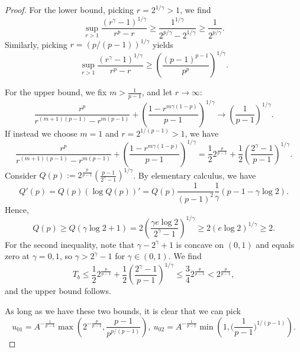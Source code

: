 \documentclass[12pt]{amsart}%
\theoremstyle{definition}
\theoremstyle{remark}
\renewcommand{\ge}{\geqslant}
\renewcommand{\le}{\leqslant}
\begin{document}
\begin{proof}
For the lower bound, picking $r=2^{1/\gamma}>1$, we find 
\[
 \sup_{r>1}\frac{(r^{\gamma}-1)^{1/\gamma}}{r^p-r}\ge \frac{1^{1/\gamma}}{2^{p/\gamma}-2^{1/\gamma}}\ge \frac{1}{2^{p/\gamma}}.
\]
Similarly, picking $r=(p/(p-1))^{1/\gamma}$ yields\[
\sup_{r>1}\frac{(r^{\gamma}-1)^{1/\gamma}}{r^p-r}\ge \left(\frac{(p-1)^{p-1}}{p^p}\right)^{1/\gamma}.
\]

For the upper bound, we fix $m>\frac{1}{p-1}$, and let $r\to\infty$:
\[
\frac{r^p}{r^{(m+1)(p-1)}-r^{m(p-1)}}+\left(\frac{1-r^{m\gamma(1-p)}}{p-1}\right)^{1/\gamma}\to \left(\frac{1}{p-1}\right)^{1/\gamma}.
\] 
If instead we choose $m=1$ and $r=2^{1/(p-1)}>1$, we have 
\[
\frac{r^p}{r^{(m+1)(p-1)}-r^{m(p-1)}}+\left(\frac{1-r^{m\gamma(1-p)}}{p-1}\right)^{1/\gamma}
=\frac{1}{2}2^{\frac{p}{p-1}}+\frac{1}{2}\left(\frac{2^{\gamma}-1}{p-1}\right)^{1/\gamma}.
\]
Consider $Q(p):=2^{\frac{p}{p-1}}\left(\frac{p-1}{2^{\gamma}-1}\right)^{1/\gamma}$. By elementary calculus, we have
\[
Q'(p)=Q(p)\left(\log Q(p)\right)'=Q(p)\frac{1}{(p-1)^2}\frac{1}{\gamma}(p-1-\gamma\log 2).
\]
 Hence, \[
Q(p)\ge Q(\gamma\log 2+1)
=2\left(\frac{\gamma e\log 2}{2^{\gamma}-1}\right)^{1/\gamma}\ge 2(e\log 2)^{1/\gamma}\ge 2.
\]
For the second inequality, note that $\gamma-2^{\gamma}+1$ is concave on $(0,1)$ and equals zero at $\gamma=0,1$, so $\gamma>2^{\gamma}-1$ for $\gamma\in (0,1)$.
We find 
\[
T_b\le \frac{1}{2}2^{\frac{p}{p-1}}+\frac{1}{2}\left(\frac{2^{\gamma}-1}{p-1}\right)^{1/\gamma}\le \frac{3}{4}2^{\frac{p}{p-1}}<2^{\frac{p}{p-1}},
\]
and the upper bound follows.

As long as we have these two bounds, it is clear that we can pick 
\[
u_{01}=A^{-\frac{1}{p-1}}\max\left(2^{-\frac{p}{p-1}}, \frac{p-1}{p^{p/(p-1)}}\right),~u_{02}=A^{-\frac{1}{p-1}}\min\left(1, \Big(\frac{1}{p-1}\Big)^{1/(p-1)}\right).
\]
\end{proof}
\end{document}
